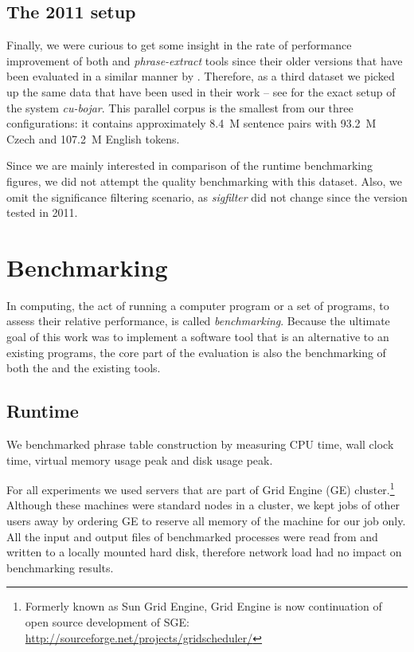 \subsection{The 2011 setup}
Finally, we were curious to get some insight in the rate of performance improvement
of both \eppex{} and \emph{phrase-extract} tools since their older versions that have
been evaluated in a similar manner by \citet{przywara:eppex}.
Therefore, as a third dataset we picked up the same data that have been used in their
work -- see \citet{marecek:twostep} for the exact setup of the system \emph{cu-bojar}.
This parallel corpus is the smallest from our three configurations: it contains
approximately 8.4~M sentence pairs with 93.2~M Czech and 107.2~M English tokens.

Since we are mainly interested in comparison of the runtime benchmarking figures,
we did not attempt the quality benchmarking with this dataset.
Also, we omit the significance filtering scenario, as \emph{sigfilter} did not change
since the version tested in 2011.

\section{Benchmarking}

In computing, the act of running a computer program or a set of programs, to assess their relative
performance, is called \emph{benchmarking}.
Because the ultimate goal of this work was to implement a software tool that is an alternative
to an existing programs, the core part of the evaluation is also the benchmarking of both the
\eppex{} and the existing tools.

\subsection{Runtime}
\label{sec:runtime-benchmarking}

We benchmarked phrase table construction by measuring CPU time, wall clock time,
virtual memory usage peak and disk usage peak.

For all experiments we used servers that are part of Grid Engine (GE) cluster.\footnote{Formerly
known as Sun Grid Engine, Grid Engine is now continuation of open source development of SGE:
\url{http://sourceforge.net/projects/gridscheduler/}}
Although these machines were standard nodes in a cluster, we kept jobs of other
users away by ordering GE to reserve all memory of the machine for our job only.
All the input and output files of benchmarked processes were read from and written
to a locally mounted hard disk, therefore network load had no impact on
benchmarking results.

